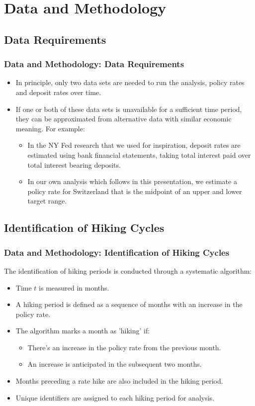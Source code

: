 \documentclass{beamer}
\begin{document}
\section{Data and Methodology}
\subsection{Data Requirements}
\begin{frame}
\frametitle{Data and Methodology: Data Requirements}
\begin{itemize}
  \item In principle, only two data sets are needed to run the analysis, policy rates and deposit rates over time.
  \item If one or both of these data sets is unavailable for a sufficient time period, they can be approximated from alternative data with similar economic meaning. For example:
  \begin{itemize}
    \item In the NY Fed research that we used for inspiration, deposit rates are estimated using bank financial statements, taking total interest paid over total interest bearing deposits. 
    \item In our own analysis which follows in this presentation, we estimate a policy rate for Switzerland that is the midpoint of an upper and lower target range.
  \end{itemize}  
  \end{itemize}
\end{frame}

\subsection{Identification of Hiking Cycles}
\begin{frame}
\frametitle{Data and Methodology: Identification of Hiking Cycles}
The identification of hiking periods is conducted through a systematic algorithm:
\begin{itemize}
  \item Time \( t \) is measured in months.
  \item A hiking period is defined as a sequence of months with an increase in the policy rate.
  \item The algorithm marks a month as 'hiking' if:
  \begin{itemize}
    \item There's an increase in the policy rate from the previous month.
    \item An increase is anticipated in the subsequent two months.
  \end{itemize}
  \item Months preceding a rate hike are also included in the hiking period.
  \item Unique identifiers are assigned to each hiking period for analysis.
\end{itemize}
\end{frame}
\end{document}
